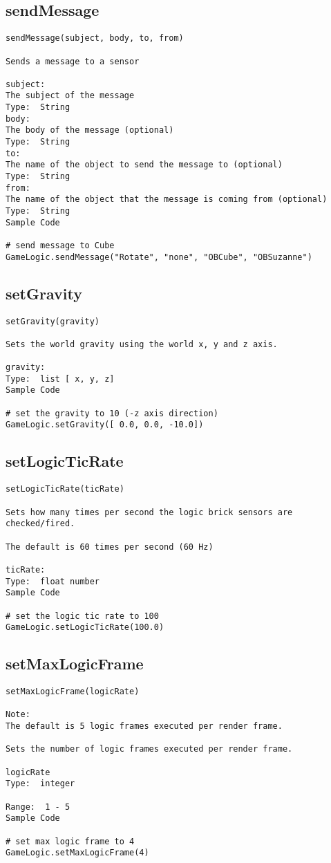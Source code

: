 \subsection{sendMessage}
\begin{verbatim}
sendMessage(subject, body, to, from)

Sends a message to a sensor 

subject:
The subject of the message
Type:  String
body:
The body of the message (optional)
Type:  String
to:
The name of the object to send the message to (optional)
Type:  String
from: 
The name of the object that the message is coming from (optional)
Type:  String
Sample Code

# send message to Cube
GameLogic.sendMessage("Rotate", "none", "OBCube", "OBSuzanne")
\end{verbatim}

\subsection{setGravity}
\begin{verbatim}
setGravity(gravity)

Sets the world gravity using the world x, y and z axis.

gravity:
Type:  list [ x, y, z]
Sample Code

# set the gravity to 10 (-z axis direction)
GameLogic.setGravity([ 0.0, 0.0, -10.0])
\end{verbatim}

\subsection{setLogicTicRate}
\begin{verbatim}
setLogicTicRate(ticRate)

Sets how many times per second the logic brick sensors are checked/fired.  

The default is 60 times per second (60 Hz)

ticRate:
Type:  float number
Sample Code

# set the logic tic rate to 100
GameLogic.setLogicTicRate(100.0)
\end{verbatim}

\subsection{setMaxLogicFrame}
\begin{verbatim}
setMaxLogicFrame(logicRate)

Note:
The default is 5 logic frames executed per render frame.

Sets the number of logic frames executed per render frame.

logicRate
Type:  integer

Range:  1 - 5
Sample Code

# set max logic frame to 4
GameLogic.setMaxLogicFrame(4)
\end{verbatim}

